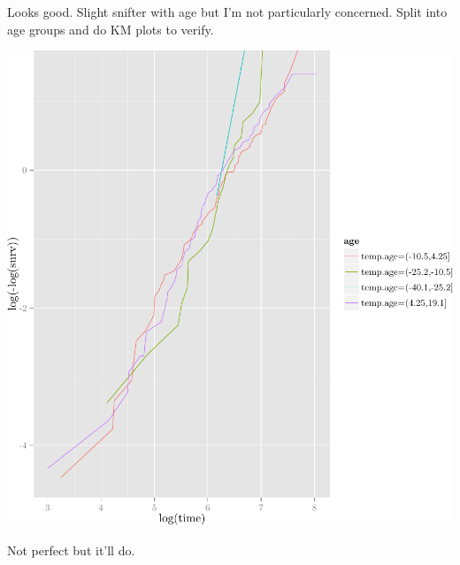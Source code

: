 \documentclass{article}
\begin{document}
Looks good.  Slight snifter with age but I'm not particularly concerned.
Split into age groups and do KM plots to verify.
\begin{knitrout}
\color{fgcolor}\begin{kframe}
\begin{alltt}
 \hlkwb{=} \hlopt{$} \hlstd{)}
 \hlkwb{=} \hlstd{(} \hlopt{~} 
\hlstd{(}\hlstd{(} \hlopt{$}  \hlopt{$}  \hlstd{=} \hlstd{(}\hlopt{$}\hlopt{$} \hlstd{(} \hlstd{=} \hlstd{(}\hlopt{-}  \hlstd{=}    \hlopt{+} \hlstd{()}
\end{alltt}
\end{kframe}

{\centering \includegraphics[width=\maxwidth]{figure/05-eda-ph-check-full-age-1} 

}



\end{knitrout}
Not perfect but it'll do.
\end{document}
